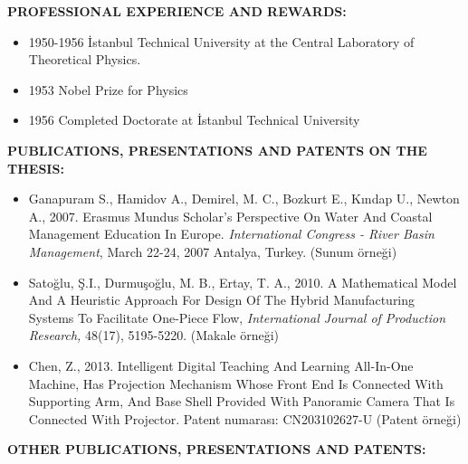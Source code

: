 \textbf{PROFESSIONAL EXPERIENCE AND REWARDS:}   
\vspace{-3mm}
\begin{itemize}
  \item 1950-1956 İstanbul Technical University at the Central Laboratory of Theoretical Physics.
  \item 1953 Nobel Prize for Physics
  \item 1956 Completed Doctorate at İstanbul Technical University
\end{itemize}

\textbf{PUBLICATIONS, PRESENTATIONS AND PATENTS ON THE THESIS:} 
\vspace{-3mm}
\begin{itemize}
   \item Ganapuram S., Hamidov A., Demirel, M. C., Bozkurt E., Kındap U., Newton A.,
   2007. Erasmus Mundus Scholar's Perspective On Water And Coastal
   Management Education In Europe. 
   \textit{International Congress - River Basin Management}, 
   March 22-24, 2007 Antalya, Turkey. (Sunum örneği)

   \item Satoğlu, Ş.I., Durmuşoğlu, M. B., Ertay, T. A., 2010. A Mathematical Model 
   And A Heuristic Approach For Design Of The Hybrid Manufacturing Systems 
   To Facilitate One-Piece Flow, 
   \textit{International Journal of Production Research,}
   48(17), 5195-5220. (Makale örneği)


   \item  Chen, Z., 2013. Intelligent Digital Teaching And Learning All-In-One Machine,
   Has Projection Mechanism Whose Front End Is Connected With Supporting
   Arm, And Base Shell Provided With Panoramic Camera That Is Connected With
   Projector. Patent numarası: CN203102627-U (Patent örneği)
\end{itemize}

\newpage

\textbf{OTHER PUBLICATIONS, PRESENTATIONS AND PATENTS:} 
\vspace{-3mm}

